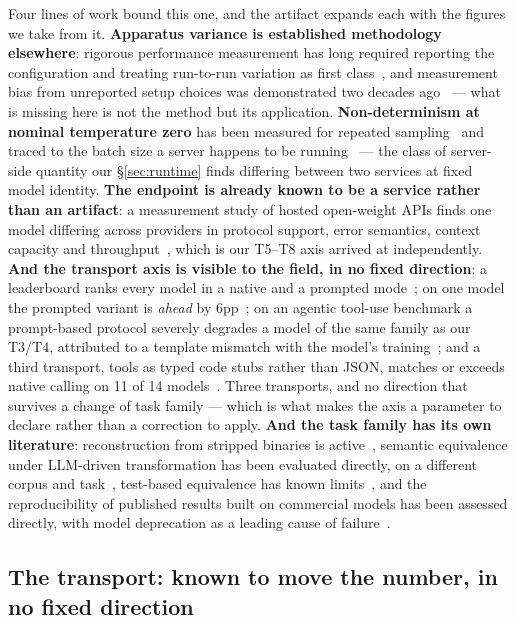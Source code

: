 Four lines of work bound this one, and the artifact expands each with the figures we take from it.
\textbf{Apparatus variance is established methodology elsewhere}: rigorous performance measurement has
long required reporting the configuration and treating run-to-run variation as first
class~\citep{georges2007rigorous,iosup2011variability}, and measurement bias from unreported setup
choices was demonstrated two decades ago~\citep{mytkowicz2009wrongdata} --- what is missing here is not
the method but its application. \textbf{Non-determinism at nominal temperature zero} has been measured for repeated
sampling~\citep{atil-nondeterminism} and traced to the batch size a server happens to be
running~\citep{he2025nondeterminism} --- the class of server-side quantity our \S\ref{sec:runtime} finds
differing between two services at fixed model identity. \textbf{The endpoint is already known to be a service rather than an artifact}: a measurement study of
hosted open-weight APIs finds one model differing across providers in protocol support, error semantics,
context capacity and throughput~\citep{li2026service}, which is our T5--T8 axis arrived at independently.
\textbf{And the transport axis is visible to the field, in no fixed direction}: a leaderboard ranks every
model in a native and a prompted mode~\citep{bfcl2025}; on one model the prompted variant is \emph{ahead}
by 6pp~\citep{bfcl-leaderboard,bfcl-issue606}; on an agentic tool-use benchmark a prompt-based protocol
severely degrades a model of the same family as our T3/T4, attributed to a template mismatch with the
model's training~\citep{mcpverse2025}; and a third transport, tools as typed code stubs rather than JSON,
matches or exceeds native calling on 11 of 14 models~\citep{bitterlesson2026}. Three transports, and no
direction that survives a change of task family --- which is what makes the axis a parameter to declare
rather than a correction to apply. \textbf{And the task family has its own literature}:
reconstruction from stripped binaries is active~\citep{tan2024llm4decompile,jiang2025nova}, semantic
equivalence under LLM-driven transformation has been evaluated directly, on a different corpus and
task~\citep{detomasi2025obfuscation}, test-based equivalence has known
limits~\citep{liu-wang-issta2020}, and the reproducibility of published results built on
commercial models has been assessed directly, with model deprecation as a leading cause of
failure~\citep{angermeir2026reproducibility}.

\subsection{The transport: known to move the number, in no fixed direction}

